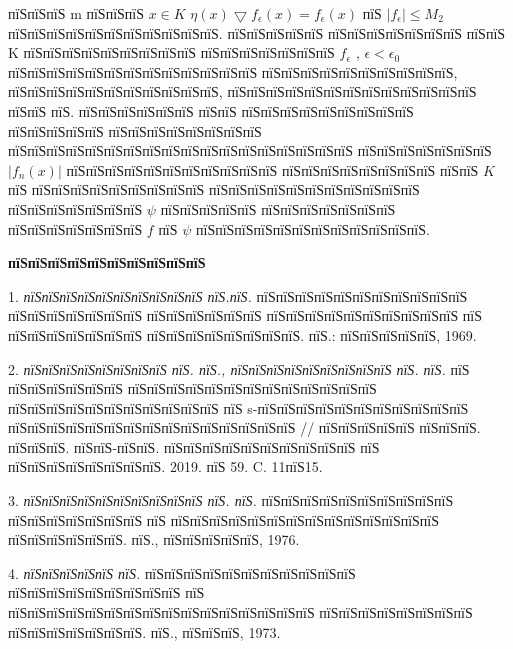 \documentclass[a5paper, 12pt, openbib]{report}
\begin{document}
 пїЅпїЅпїЅ m 
пїЅпїЅпїЅ  $x\in K$ $\eta(x)\bigtriangledown f_{\epsilon}(x)=f_{\epsilon}(x)$   пїЅ $|f_\epsilon|\leq M_2$  пїЅпїЅпїЅпїЅпїЅпїЅпїЅпїЅпїЅпїЅпїЅ.
пїЅпїЅпїЅпїЅпїЅ пїЅпїЅпїЅпїЅпїЅпїЅпїЅ пїЅпїЅ K пїЅпїЅпїЅпїЅпїЅпїЅпїЅпїЅпїЅ пїЅпїЅпїЅпїЅпїЅпїЅпїЅ $f_\epsilon$ , $\epsilon<\epsilon_0$   пїЅпїЅпїЅпїЅпїЅпїЅпїЅпїЅпїЅпїЅпїЅпїЅпїЅ пїЅпїЅпїЅпїЅпїЅпїЅпїЅпїЅпїЅпїЅ, пїЅпїЅпїЅпїЅпїЅпїЅпїЅпїЅпїЅпїЅпїЅ, пїЅпїЅпїЅпїЅпїЅпїЅпїЅпїЅпїЅпїЅпїЅпїЅпїЅ пїЅпїЅ пїЅ. пїЅпїЅпїЅпїЅпїЅпїЅ пїЅпїЅ пїЅпїЅпїЅпїЅпїЅпїЅпїЅпїЅпїЅ пїЅпїЅпїЅпїЅпїЅ пїЅпїЅпїЅпїЅпїЅпїЅпїЅпїЅ пїЅпїЅпїЅпїЅпїЅпїЅпїЅпїЅпїЅпїЅпїЅпїЅпїЅпїЅпїЅпїЅпїЅпїЅ пїЅпїЅпїЅпїЅпїЅпїЅпїЅ $|f_{n}(x)|$  пїЅпїЅпїЅпїЅпїЅпїЅпїЅпїЅпїЅпїЅпїЅ пїЅпїЅпїЅпїЅпїЅпїЅпїЅпїЅ пїЅпїЅ $K$ пїЅ пїЅпїЅпїЅпїЅпїЅпїЅпїЅпїЅпїЅ пїЅпїЅпїЅпїЅпїЅпїЅпїЅпїЅпїЅпїЅпїЅ пїЅпїЅпїЅпїЅпїЅпїЅпїЅ $\psi$ пїЅпїЅпїЅпїЅпїЅ пїЅпїЅпїЅпїЅпїЅпїЅпїЅ пїЅпїЅпїЅпїЅпїЅпїЅпїЅ $f$ пїЅ $\psi$ пїЅпїЅпїЅпїЅпїЅпїЅпїЅпїЅпїЅпїЅпїЅпїЅ.

\smallskip \centerline {\bf пїЅпїЅпїЅпїЅпїЅпїЅпїЅпїЅпїЅпїЅ} \nopagebreak

1. {\it пїЅпїЅпїЅпїЅпїЅпїЅпїЅпїЅпїЅпїЅ пїЅ.пїЅ.} пїЅпїЅпїЅпїЅпїЅпїЅпїЅпїЅпїЅпїЅпїЅ пїЅпїЅпїЅпїЅпїЅпїЅпїЅ пїЅпїЅпїЅпїЅпїЅпїЅ пїЅпїЅпїЅпїЅпїЅпїЅпїЅпїЅпїЅпїЅ пїЅ пїЅпїЅпїЅпїЅпїЅпїЅпїЅ пїЅпїЅпїЅпїЅпїЅпїЅпїЅпїЅ. пїЅ.: пїЅпїЅпїЅпїЅпїЅ, 1969.

2. {\it пїЅпїЅпїЅпїЅпїЅпїЅпїЅпїЅ пїЅ. пїЅ., пїЅпїЅпїЅпїЅпїЅпїЅпїЅпїЅпїЅ пїЅ. пїЅ.}  пїЅ пїЅпїЅпїЅпїЅпїЅпїЅ пїЅпїЅпїЅпїЅпїЅпїЅпїЅпїЅпїЅпїЅпїЅпїЅпїЅ пїЅпїЅпїЅпїЅпїЅпїЅпїЅпїЅпїЅпїЅпїЅ пїЅ s-пїЅпїЅпїЅпїЅпїЅпїЅпїЅпїЅпїЅпїЅпїЅ пїЅпїЅпїЅпїЅпїЅпїЅпїЅпїЅпїЅпїЅпїЅпїЅпїЅпїЅпїЅ // пїЅпїЅпїЅпїЅпїЅ пїЅпїЅпїЅ. пїЅпїЅпїЅ. пїЅпїЅ-пїЅпїЅ. пїЅпїЅпїЅпїЅпїЅпїЅпїЅпїЅпїЅпїЅ пїЅ пїЅпїЅпїЅпїЅпїЅпїЅпїЅпїЅ. 2019. пїЅ 59. C. 11пїЅ15.

3. {\it пїЅпїЅпїЅпїЅпїЅпїЅпїЅпїЅпїЅпїЅ пїЅ. пїЅ.} пїЅпїЅпїЅпїЅпїЅпїЅпїЅпїЅпїЅпїЅ пїЅпїЅпїЅпїЅпїЅпїЅпїЅ пїЅ пїЅпїЅпїЅпїЅпїЅпїЅпїЅпїЅпїЅпїЅпїЅпїЅпїЅпїЅ пїЅпїЅпїЅпїЅпїЅпїЅ. пїЅ., пїЅпїЅпїЅпїЅпїЅ, 1976.

4. {\it пїЅпїЅпїЅпїЅпїЅ пїЅ.} пїЅпїЅпїЅпїЅпїЅпїЅпїЅпїЅпїЅпїЅпїЅ пїЅпїЅпїЅпїЅпїЅпїЅпїЅпїЅпїЅ пїЅ пїЅпїЅпїЅпїЅпїЅпїЅпїЅпїЅпїЅпїЅпїЅпїЅпїЅпїЅпїЅпїЅ пїЅпїЅпїЅпїЅпїЅпїЅпїЅпїЅ пїЅпїЅпїЅпїЅпїЅпїЅпїЅ. пїЅ., пїЅпїЅпїЅ, 1973.
\end{document}
